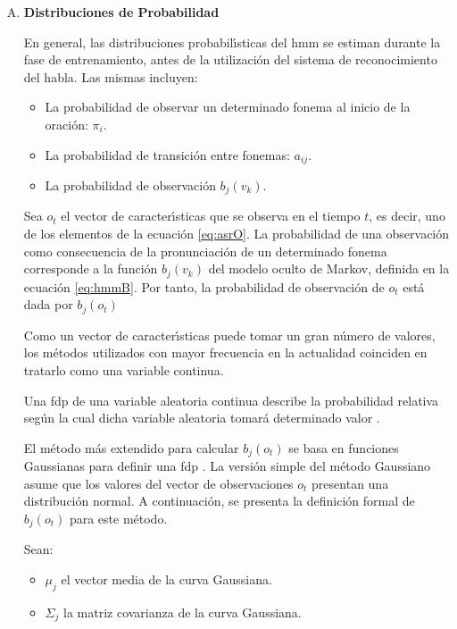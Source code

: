 \begin{enumerate}[A)]
	Esto es, siendo $O$ la secuencia de observaciones de la ecuaci\'on \ref{eq:asrO} 
	y $V$ el conjunto de s{\'\i}mbolos observables de la ecuaci\'on \ref{eq:hmmV}, 
	$o_1,o_2,o_3,\ldots,o_T \in V$.

	\item \textbf{Distribuciones de Probabilidad}


	En general, las distribuciones probabil{\'\i}sticas del \gls{hmm} se estiman durante la fase de 
	entrenamiento, antes de la utilizaci\'on del sistema de reconocimiento del habla. 
	Las mismas incluyen:

	\begin{itemize}
		\item La probabilidad de observar un determinado fonema al inicio de la oraci\'on: $\pi_i$.
		\item La probabilidad de transici\'on entre fonemas: $a_{ij}$.
		\item La probabilidad de observaci\'on $b_j(v_k)$. 
	\end{itemize}

	Sea $o_t$ el vector de caracter{\'\i}sticas que se observa en el tiempo $t$, es decir, 
	uno de los elementos de la ecuaci\'on \ref{eq:asrO}.
	La probabilidad de una observaci\'on como consecuencia de la pronunciaci\'on de un determinado fonema 
	corresponde a la funci\'on $b_j(v_k)$ del modelo oculto de Markov, definida en la 
	ecuaci\'on \ref{eq:hmmB}.
	Por tanto, la probabilidad de observaci\'on de $o_t$ est\'a dada por $b_j(o_t)$ 

	Como un vector de caracter{\'\i}sticas puede tomar un gran n\'umero de valores, los m\'etodos 
	utilizados con mayor frecuencia en la actualidad coinciden en tratarlo como una variable continua.

	Una \gls{fdp} de una variable aleatoria continua describe la probabilidad relativa seg\'un la cual 
	dicha variable aleatoria tomar\'a determinado valor \cite{Evans2011}.

	El m\'etodo m\'as extendido para calcular $b_j(o_t)$ se basa en funciones Gaussianas para definir 
	una \gls{fdp} \cite{Jurafsky}.
	La versi\'{o}n simple del m\'etodo Gaussiano asume que los valores del vector de observaciones $o_t$ presentan una distribuci\'on normal. A continuaci\'on, se presenta la definici\'on formal 
	de $b_j(o_t)$ para este m\'etodo.

	Sean:

	\begin{itemize}
		\item $\mu_j$ el vector media de la curva Gaussiana.
		\item $\Sigma_j$ la matriz covarianza de la curva Gaussiana.
	\end{itemize}


\end{enumerate}
